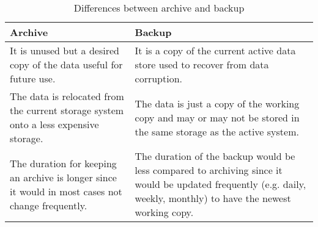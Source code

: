 \begin{table}[H]
    \centering
    \begin{tabular}{|p{8cm}|p{8cm}|}
        \hline
            \textbf{Archive}  & \textbf{Backup}\\
        \hline
            It is unused but a desired copy of the data useful for future use.& 
            It is a copy of the current active data store used to recover from data corruption. \\
        \hline
            The data is relocated from the current storage system onto a less expensive storage.
            & The data is just a copy of the working copy and may or may not be stored in the same storage as the active system.\\
        \hline
             The duration for keeping an archive is longer since it would in most cases not change frequently.
             & The duration of the backup would be less compared to archiving since it would be updated frequently (e.g. daily, weekly, monthly) to have the newest 
             working copy.\\
        \hline
    \end{tabular}
    \caption{Differences between archive and backup}
    \label{table:archiveVsBackup}     
\end{table}    
